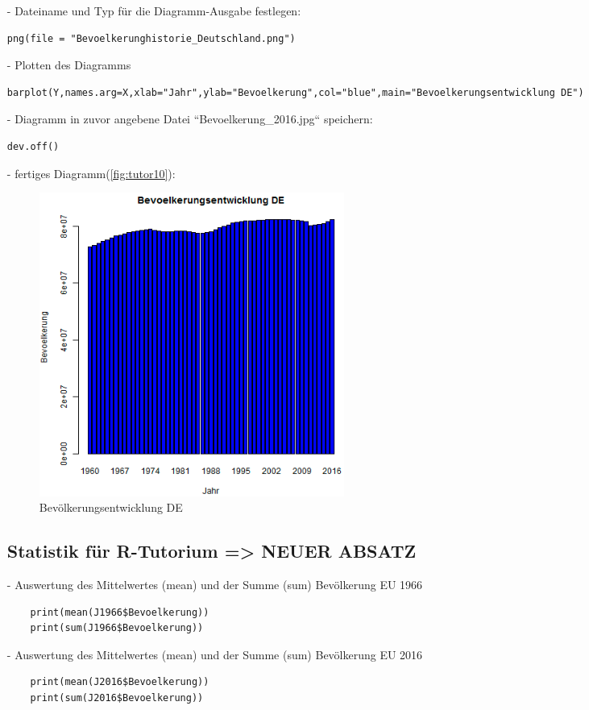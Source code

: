 \begin{itemize}
\item[-]Dateiname und Typ für die Diagramm-Ausgabe festlegen:
\begin{lstlisting}
png(file = "Bevoelkerunghistorie_Deutschland.png")
\end{lstlisting}
\item[-]Plotten des Diagramms
\begin{lstlisting}
barplot(Y,names.arg=X,xlab="Jahr",ylab="Bevoelkerung",col="blue",main="Bevoelkerungsentwicklung DE")
\end{lstlisting}
\item[-]Diagramm in zuvor angebene Datei ``Bevoelkerung\_2016.jpg`` speichern:
\begin{lstlisting}
dev.off()
\end{lstlisting}
\item[-]fertiges Diagramm(\autoref{fig:tutor10}):
\begin{figure}[!htb]
        \begin{minipage}{1\textwidth}
                \centering
                \includegraphics[width=0.50\textwidth]{pics/tutor10.png}\par\vspace{0cm}
                \caption{Bevölkerungsentwicklung DE}
                \label{fig:tutor10}
        \end{minipage}
\end{figure}
\subsection*{Statistik für R-Tutorium => NEUER ABSATZ}
\item[-]Auswertung des Mittelwertes (mean) und der Summe (sum) Bevölkerung EU 1966
\begin{lstlisting}
	print(mean(J1966$Bevoelkerung))
	print(sum(J1966$Bevoelkerung))
\end{lstlisting}

\item[-]Auswertung des Mittelwertes (mean) und der Summe (sum) Bevölkerung EU 2016
\begin{lstlisting}
	print(mean(J2016$Bevoelkerung))
	print(sum(J2016$Bevoelkerung))
\end{lstlisting}

\end{itemize}
